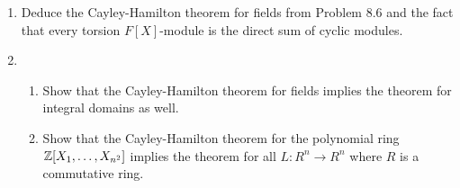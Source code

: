 \documentclass[../psets.tex]{subfiles}
\begin{document}
\begin{enumerate}
    \item Deduce the Cayley-Hamilton theorem for fields from Problem 8.6 and the fact that every torsion $F[X]$-module is the direct sum of cyclic modules.
    \item 
    \begin{enumerate}
        \item Show that the Cayley-Hamilton theorem for fields implies the theorem for integral domains as well.
        \item Show that the Cayley-Hamilton theorem for the polynomial ring $\mathbb{Z}[X_1,\dots,X_{n^2}]$ implies the theorem for all $L:R^n\to R^n$ where $R$ is a commutative ring.
    \end{enumerate}
\end{enumerate}
\end{document}
